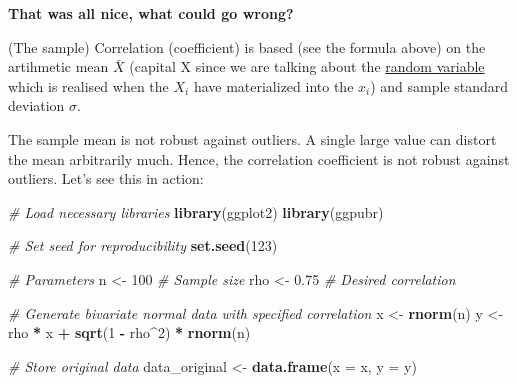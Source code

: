 \documentclass[
]{book}
\newenvironment{Shaded}{\begin{snugshade}}{\end{snugshade}}
\newcommand{\AttributeTok}[1]{\textcolor[rgb]{0.13,0.29,0.53}{#1}}
\newcommand{\CommentTok}[1]{\textcolor[rgb]{0.56,0.35,0.01}{\textit{#1}}}
\newcommand{\DecValTok}[1]{\textcolor[rgb]{0.00,0.00,0.81}{#1}}
\newcommand{\FloatTok}[1]{\textcolor[rgb]{0.00,0.00,0.81}{#1}}
\newcommand{\FunctionTok}[1]{\textcolor[rgb]{0.13,0.29,0.53}{\textbf{#1}}}
\newcommand{\NormalTok}[1]{#1}
\newcommand{\OtherTok}[1]{\textcolor[rgb]{0.56,0.35,0.01}{#1}}
\newcommand{\SpecialCharTok}[1]{\textcolor[rgb]{0.81,0.36,0.00}{\textbf{#1}}}
\begin{document}
\textbf{That was all nice, what could go wrong?}

(The sample) Correlation (coefficient) is based (see the formula above) on the artihmetic mean \(\bar{X}\)
(capital X since we are talking about the
\href{https://www.youtube.com/watch?v=Y9nsL69CwbU&ab_channel=VeryNormal}{random variable} which is realised when
the \(X_i\) have materialized into the \(x_i\)) and sample standard deviation \(\sigma\).

The sample mean is not robust against outliers. A single large value can distort the mean arbitrarily much.
Hence, the correlation coefficient is not robust against outliers. Let's see this in action:

\begin{Shaded}
\begin{Highlighting}[]
\CommentTok{\# Load necessary libraries}
\FunctionTok{library}\NormalTok{(ggplot2)}
\FunctionTok{library}\NormalTok{(ggpubr)}

\CommentTok{\# Set seed for reproducibility}
\FunctionTok{set.seed}\NormalTok{(}\DecValTok{123}\NormalTok{)}

\CommentTok{\# Parameters}
\NormalTok{n }\OtherTok{\textless{}{-}} \DecValTok{100}  \CommentTok{\# Sample size}
\NormalTok{rho }\OtherTok{\textless{}{-}} \FloatTok{0.75}  \CommentTok{\# Desired correlation}

\CommentTok{\# Generate bivariate normal data with specified correlation}
\NormalTok{x }\OtherTok{\textless{}{-}} \FunctionTok{rnorm}\NormalTok{(n)}
\NormalTok{y }\OtherTok{\textless{}{-}}\NormalTok{ rho }\SpecialCharTok{*}\NormalTok{ x }\SpecialCharTok{+} \FunctionTok{sqrt}\NormalTok{(}\DecValTok{1} \SpecialCharTok{{-}}\NormalTok{ rho}\SpecialCharTok{\^{}}\DecValTok{2}\NormalTok{) }\SpecialCharTok{*} \FunctionTok{rnorm}\NormalTok{(n)}

\CommentTok{\# Store original data}
\NormalTok{data\_original }\OtherTok{\textless{}{-}} \FunctionTok{data.frame}\NormalTok{(}\AttributeTok{x =}\NormalTok{ x, }\AttributeTok{y =}\NormalTok{ y)}


\end{Highlighting}
\end{Shaded}
\end{document}
